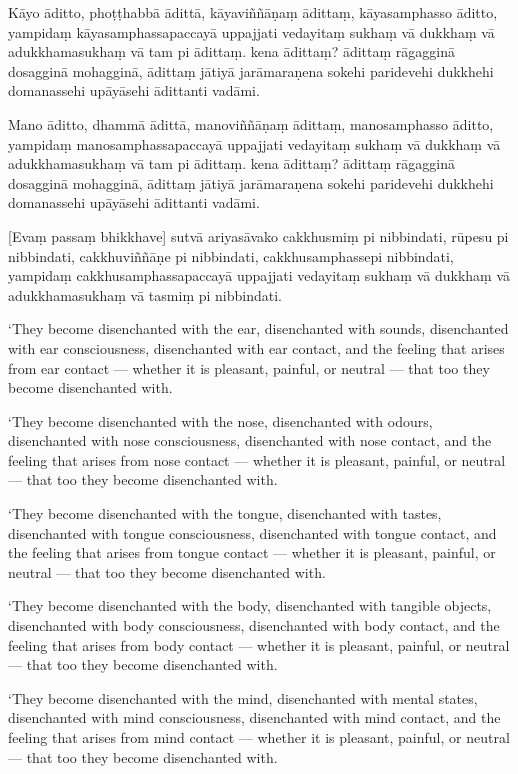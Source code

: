 Kāyo āditto, phoṭṭhabbā ādittā, kāyaviññāṇaṃ ādittaṃ, kāyasamphasso
āditto, yampidaṃ kāyasamphassapaccayā uppajjati vedayitaṃ sukhaṃ vā
dukkhaṃ vā adukkhamasukhaṃ vā tam pi ādittaṃ. kena ādittaṃ? ādittaṃ
rāgagginā dosagginā mohagginā, ādittaṃ jātiyā jarāmaraṇena sokehi
paridevehi dukkhehi domanassehi upāyāsehi ādittanti vadāmi.

Mano āditto, dhammā ādittā, manoviññāṇaṃ ādittaṃ, manosamphasso āditto,
yampidaṃ manosamphassapaccayā uppajjati vedayitaṃ sukhaṃ vā dukkhaṃ vā
adukkhamasukhaṃ vā tam pi ādittaṃ. kena ādittaṃ? ādittaṃ rāgagginā
dosagginā mohagginā, ādittaṃ jātiyā jarāmaraṇena sokehi paridevehi
dukkhehi domanassehi upāyāsehi ādittanti vadāmi.

\enlargethispage{2\baselineskip}

[Evaṃ passaṃ bhikkhave] sutvā ariyasāvako cakkhusmiṃ pi nibbindati,
rūpesu pi nibbindati, cakkhuviññāṇe pi nibbindati, cakkhusamphassepi
nibbindati, yampidaṃ cakkhusamphassapaccayā uppajjati vedayitaṃ sukhaṃ
vā dukkhaṃ vā adukkhamasukhaṃ vā tasmiṃ pi nibbindati.

\clearpage

\englishText
\markboth{\englishTitle}{\rightmark}

‘They become disenchanted with the ear, disenchanted with sounds,
disenchanted with ear consciousness, disenchanted with ear contact, and
the feeling that arises from ear contact --- whether it is pleasant,
painful, or neutral --- that too they become disenchanted with.

‘They become disenchanted with the nose, disenchanted with odours,
disenchanted with nose consciousness, disenchanted with nose contact,
and the feeling that arises from nose contact --- whether it is pleasant,
painful, or neutral --- that too they become disenchanted with.

‘They become disenchanted with the tongue, disenchanted with tastes,
disenchanted with tongue consciousness, disenchanted with tongue
contact, and the feeling that arises from tongue contact --- whether it is
pleasant, painful, or neutral --- that too they become disenchanted with.

‘They become disenchanted with the body, disenchanted with tangible
objects, disenchanted with body consciousness, disenchanted with body
contact, and the feeling that arises from body contact --- whether it is
pleasant, painful, or neutral --- that too they become disenchanted with.

‘They become disenchanted with the mind, disenchanted with mental
states, disenchanted with mind consciousness, disenchanted with mind
contact, and the feeling that arises from mind contact --- whether it is
pleasant, painful, or neutral --- that too they become disenchanted with.

